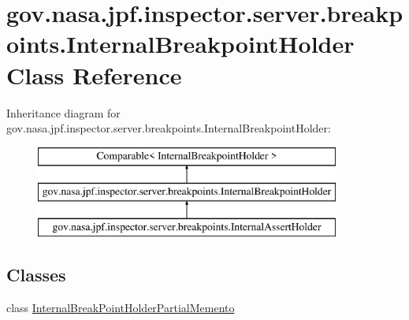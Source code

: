 \hypertarget{classgov_1_1nasa_1_1jpf_1_1inspector_1_1server_1_1breakpoints_1_1_internal_breakpoint_holder}{}\section{gov.\+nasa.\+jpf.\+inspector.\+server.\+breakpoints.\+Internal\+Breakpoint\+Holder Class Reference}
\label{classgov_1_1nasa_1_1jpf_1_1inspector_1_1server_1_1breakpoints_1_1_internal_breakpoint_holder}
Inheritance diagram for gov.\+nasa.\+jpf.\+inspector.\+server.\+breakpoints.\+Internal\+Breakpoint\+Holder\+:\begin{figure}[H]
\begin{center}
\leavevmode
\includegraphics[height=3.000000cm]{classgov_1_1nasa_1_1jpf_1_1inspector_1_1server_1_1breakpoints_1_1_internal_breakpoint_holder}
\end{center}
\end{figure}
\subsection*{Classes}
\begin{DoxyCompactItemize}
\item 
class \hyperlink{classgov_1_1nasa_1_1jpf_1_1inspector_1_1server_1_1breakpoints_1_1_internal_breakpoint_holder_1_13ca7fc5bb2b7ecd1495c4d5e8a0f1a71}{Internal\+Break\+Point\+Holder\+Partial\+Memento}
\end{DoxyCompactItemize}
